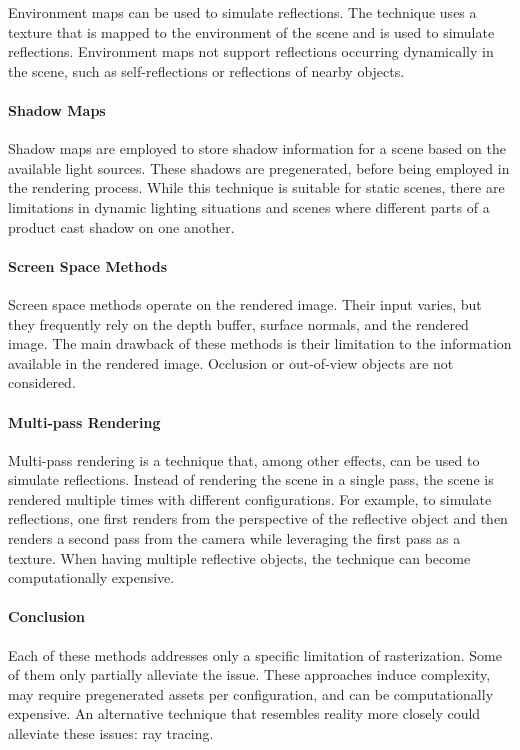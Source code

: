 Environment maps can be used to simulate reflections. The technique uses a texture that is mapped to the environment of the scene and is used to simulate reflections. Environment maps not support reflections occurring dynamically in the scene, such as self-reflections or reflections of nearby objects.

\paragraph{Shadow Maps}

Shadow maps are employed to store shadow information for a scene based on the available light sources. These shadows are pregenerated, before being employed in the rendering process. While this technique is suitable for static scenes, there are limitations in dynamic lighting situations and scenes where different parts of a product cast shadow on one another.

\paragraph{Screen Space Methods}

Screen space methods operate on the rendered image. Their input varies, but they frequently rely on the depth buffer, surface normals, and the rendered image. The main drawback of these methods is their limitation to the information available in the rendered image. Occlusion or out-of-view objects are not considered.

\paragraph{Multi-pass Rendering}

Multi-pass rendering is a technique that, among other effects, can be used to simulate reflections. Instead of rendering the scene in a single pass, the scene is rendered multiple times with different configurations. For example, to simulate reflections, one first renders from the perspective of the reflective object and then renders a second pass from the camera while leveraging the first pass as a texture. When having multiple reflective objects, the technique can become computationally expensive.

\paragraph{Conclusion}

Each of these methods addresses only a specific limitation of rasterization. Some of them only partially alleviate the issue. These approaches induce complexity, may require pregenerated assets per configuration, and can be computationally expensive. An alternative technique that resembles reality more closely could alleviate these issues: ray tracing.

